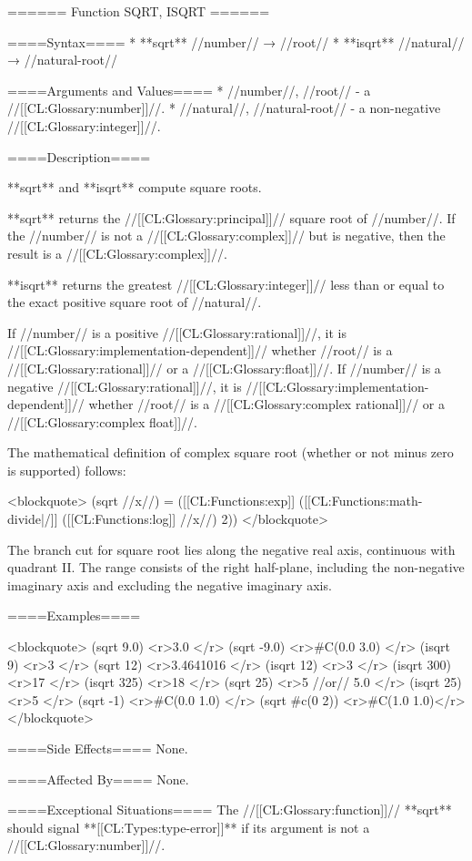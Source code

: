 ====== Function SQRT, ISQRT ======

====Syntax====
  * **sqrt** //number// → //root//
  * **isqrt** //natural// → //natural-root//

====Arguments and Values====
  * //number//, //root// - a //[[CL:Glossary:number]]//.
  * //natural//, //natural-root// - a non-negative //[[CL:Glossary:integer]]//.

====Description====

**sqrt** and **isqrt** compute square roots.

**sqrt** returns the //[[CL:Glossary:principal]]// square root of //number//. If the //number// is not a //[[CL:Glossary:complex]]// but is negative, then the result is a //[[CL:Glossary:complex]]//.

**isqrt** returns the greatest //[[CL:Glossary:integer]]// less than or equal to the exact positive square root of //natural//.

If //number// is a positive //[[CL:Glossary:rational]]//, it is //[[CL:Glossary:implementation-dependent]]// whether //root// is a //[[CL:Glossary:rational]]// or a //[[CL:Glossary:float]]//. If //number// is a negative //[[CL:Glossary:rational]]//, it is //[[CL:Glossary:implementation-dependent]]// whether //root// is a //[[CL:Glossary:complex rational]]// or a //[[CL:Glossary:complex float]]//.

The mathematical definition of complex square root (whether or not minus zero is supported) follows:

<blockquote>
(sqrt //x//) = ([[CL:Functions:exp]] ([[CL:Functions:math-divide|/]] ([[CL:Functions:log]] //x//) 2))
</blockquote>

The branch cut for square root lies along the negative real axis, continuous with quadrant II. The range consists of the right half-plane, including the non-negative imaginary axis and excluding the negative imaginary axis.

====Examples====

<blockquote>
(sqrt 9.0) <r>3.0 </r>
(sqrt -9.0) <r>#C(0.0 3.0) </r>
(isqrt 9) <r>3 </r>
(sqrt 12) <r>3.4641016 </r>
(isqrt 12) <r>3 </r>
(isqrt 300) <r>17 </r>
(isqrt 325) <r>18 </r>
(sqrt 25) <r>5 
//or// 5.0 </r>
(isqrt 25) <r>5 </r>
(sqrt -1) <r>#C(0.0 1.0) </r>
(sqrt #c(0 2)) <r>#C(1.0 1.0)</r>
</blockquote>

====Side Effects====
None.

====Affected By====
None.

====Exceptional Situations====
The //[[CL:Glossary:function]]// **sqrt** should signal **[[CL:Types:type-error]]** if its argument is not a //[[CL:Glossary:number]]//.

